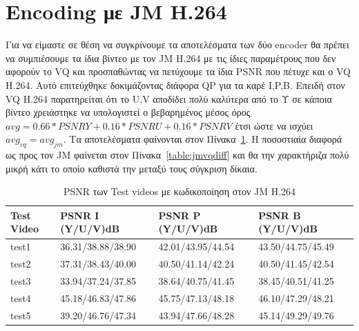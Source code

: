 \newpage
\section{Encoding με JM H.264}
\label{section:sect62}

\indent Για να είμαστε σε θέση να συγκρίνουμε τα αποτελέσματα των δύο encoder θα πρέπει να συμπιέσουμε τα ίδια βίντεο με τον JM H.264 με τις ίδιες παραμέτρους που δεν αφορούν το VQ και προσπαθώντας να πετύχουμε τα ίδια PSNR που πέτυχε και ο VQ H.264. Αυτό επιτεύχθηκε δοκιμάζοντας διάφορα QP για τα καρέ I,P,B. Επειδή στον VQ H.264 παρατηρείται ότι το U,V αποδίδει πολύ καλύτερα από το Υ σε κάποια βίντεο χρειάστηκε να υπολογιστεί ο βεβαρημένος μέσος όρος $avg = 0.66*PSNRY+0.16*PSNRU+0.16*PSNRV$ έτσι ώστε να ισχύει $avg_{vq}=avg_{jm}$. Τα αποτελέσματα φαίνονται στον Πίνακα~\ref{table:jm264}.
Η ποσοστιαία διαφορά ως προς τον JM φαίνεται στον Πίνακα~\ref{table:jmvqdiff} και θα την χαρακτήριζα πολύ μικρή κάτι το οποίο καθιστά την μεταξύ τους σύγκριση δίκαια.

\begin{table}[h!]
    \begin{center}
        \begin{tabular}{| l | l | l | l |}
        \hline
        Test Video & PSNR I (Y/U/V)dB  & PSNR P (Y/U/V)dB  & PSNR B (Y/U/V)dB       \\ \hline
        test1      & 36.31/38.88/38.90 & 42.01/43.95/44.54 & 43.50/44.75/45.49      \\ \hline
        test2      & 37.31/38.43/40.00 & 40.50/41.14/42.24 & 40.50/41.45/42.54      \\ \hline
        test3      & 33.94/37.24/37.85 & 38.64/40.75/41.45 & 38.45/40.51/41.25      \\ \hline
        test4      & 45.18/46.83/47.86 & 45.75/47.13/48.18 & 46.10/47.29/48.21      \\ \hline
        test5      & 39.20/46.76/47.34 & 43.94/47.66/48.28 & 45.14/49.29/49.76      \\ \hline
        \hline
        \end{tabular}
    \end{center}

    \caption{PSNR των Test videos με κωδικοποίηση στον JM H.264}
    \label{table:jm264}
\end{table}

